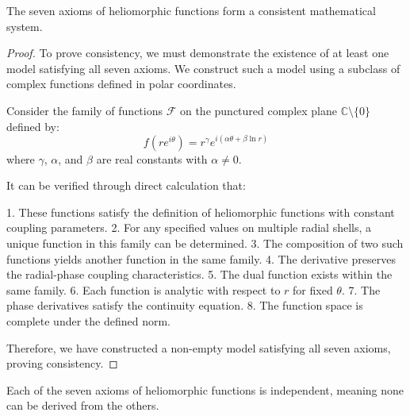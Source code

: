 \begin{theorem}
The seven axioms of heliomorphic functions form a consistent mathematical system.
\end{theorem}

\begin{proof}
To prove consistency, we must demonstrate the existence of at least one model satisfying all seven axioms. We construct such a model using a subclass of complex functions defined in polar coordinates.

Consider the family of functions $\mathcal{F}$ on the punctured complex plane $\mathbb{C} \setminus \{0\}$ defined by:
\begin{equation}
f(re^{i\theta}) = r^{\gamma}e^{i(\alpha\theta + \beta\ln r)}
\end{equation}
where $\gamma$, $\alpha$, and $\beta$ are real constants with $\alpha \neq 0$.

It can be verified through direct calculation that:

1. These functions satisfy the definition of heliomorphic functions with constant coupling parameters.
2. For any specified values on multiple radial shells, a unique function in this family can be determined.
3. The composition of two such functions yields another function in the same family.
4. The derivative preserves the radial-phase coupling characteristics.
5. The dual function exists within the same family.
6. Each function is analytic with respect to $r$ for fixed $\theta$.
7. The phase derivatives satisfy the continuity equation.
8. The function space is complete under the defined norm.

Therefore, we have constructed a non-empty model satisfying all seven axioms, proving consistency.
\end{proof}

\begin{theorem}
Each of the seven axioms of heliomorphic functions is independent, meaning none can be derived from the others.
\end{theorem}

